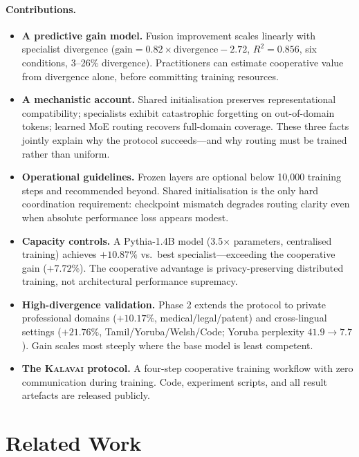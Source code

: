 \documentclass{article}
\newcommand{\kalavai}{\textsc{Kalavai}\xspace}
\begin{document}
\paragraph{Contributions.}
\begin{itemize}[leftmargin=*, itemsep=2pt]
  \item \textbf{A predictive gain model.} Fusion improvement scales linearly with specialist divergence ($\text{gain} = 0.82 \times \text{divergence} - 2.72$, $R^2 = 0.856$, six conditions, 3--26\% divergence). Practitioners can estimate cooperative value from divergence alone, before committing training resources.
  \item \textbf{A mechanistic account.} Shared initialisation preserves representational compatibility; specialists exhibit catastrophic forgetting on out-of-domain tokens; learned MoE routing recovers full-domain coverage. These three facts jointly explain why the protocol succeeds---and why routing must be trained rather than uniform.
  \item \textbf{Operational guidelines.} Frozen layers are optional below 10,000 training steps and recommended beyond. Shared initialisation is the only hard coordination requirement: checkpoint mismatch degrades routing clarity even when absolute performance loss appears modest.
  \item \textbf{Capacity controls.} A Pythia-1.4B model (3.5$\times$ parameters, centralised training) achieves $+10.87\%$ vs.\ best specialist---exceeding the cooperative gain ($+7.72\%$). The cooperative advantage is privacy-preserving distributed training, not architectural performance supremacy.
  \item \textbf{High-divergence validation.} Phase 2 extends the protocol to private professional domains ($+10.17\%$, medical/legal/patent) and cross-lingual settings ($+21.76\%$, Tamil/Yoruba/Welsh/Code; Yoruba perplexity $41.9\to7.7$). Gain scales most steeply where the base model is least competent.
  \item \textbf{The \kalavai protocol.} A four-step cooperative training workflow with zero communication during training. Code, experiment scripts, and all result artefacts are released publicly.
\end{itemize}

\section{Related Work}
\label{sec:related}
\end{document}

